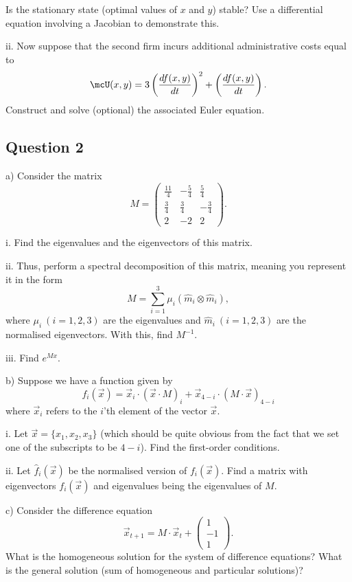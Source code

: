 \documentclass[a4paper, 12pt,oneside,openany]{book}
\begin{document}
Is the stationary state (optimal values of $x$ and $y$) stable? Use a differential equation involving a Jacobian to demonstrate this. 

ii. Now suppose that the second firm incurs additional administrative costs equal to $$\mcU(x, y)=3\left(\frac{df(x, y)}{dt}\right)^2 + \left(\frac{df(x, y)}{dt}\right).$$ Construct and solve (optional) the associated Euler equation. 

\subsection{Question 2}

a) Consider the matrix $$M=\begin{pmatrix}
\frac{11}{4} & -\frac{5}{4} & \frac{5}{4} \\
\frac{3}{4} & \frac{3}{4} & -\frac{3}{4} \\
2 & -2 & 2
\end{pmatrix}.$$

i. Find the eigenvalues and the eigenvectors of this matrix. 

ii. Thus, perform a spectral decomposition of this matrix, meaning you represent it in the form $$M = \sum\limits_{i=1}^3 \mu_i (\hat{m}_i \otimes \hat{m}_i),$$ where $\mu_i\ (i=1, 2, 3)$ are the eigenvalues and $\hat{m}_i\ (i=1, 2, 3)$ are the normalised eigenvectors. With this, find $M^{-1}$.

iii. Find $e^{Mx}$.

b) Suppose we have a function given by $$f_i(\vec{x}) = \vec{x}_i \cdot (\vec{x} \cdot M)_i + \vec{x}_{4-i} \cdot(M \cdot \vec{x})_{4-i}$$ where $\vec{x}_i$ refers to the $i$'th element of the vector $\vec{x}$. 

i. Let $\vec{x} = \{x_1, x_2, x_3\}$ (which should be quite obvious from the fact that we set one of the subscripts to be $4-i$). Find the first-order conditions.

ii. Let $\hat{f}_i(\vec{x})$ be the normalised version of $f_i(\vec{x})$. Find a matrix with eigenvectors $f_i(\vec{x})$ and eigenvalues being the eigenvalues of $M$.

c) Consider the difference equation $$\vec{x}_{t+1} = M \cdot \vec{x}_t + \begin{pmatrix} 1\\ -1\\ 1 \end{pmatrix}.$$ What is the homogeneous solution for the system of difference equations? What is the general solution (sum of homogeneous and particular solutions)?
\end{document}
